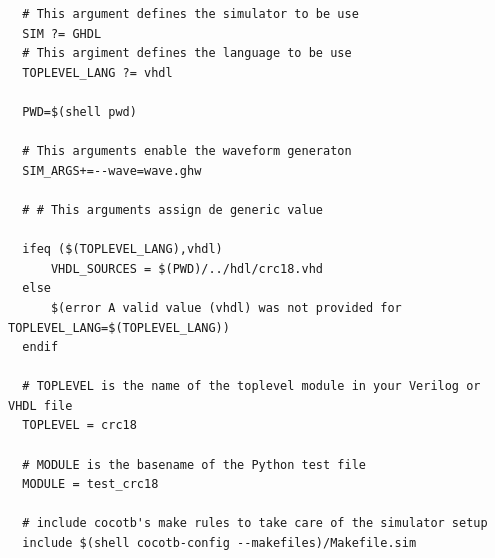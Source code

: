 {\scriptsize\begin{verbatim}
  # This argument defines the simulator to be use
  SIM ?= GHDL
  # This argiment defines the language to be use
  TOPLEVEL_LANG ?= vhdl
  
  PWD=$(shell pwd)
  
  # This arguments enable the waveform generaton
  SIM_ARGS+=--wave=wave.ghw
  
  # # This arguments assign de generic value
  
  ifeq ($(TOPLEVEL_LANG),vhdl)
      VHDL_SOURCES = $(PWD)/../hdl/crc18.vhd
  else
      $(error A valid value (vhdl) was not provided for TOPLEVEL_LANG=$(TOPLEVEL_LANG))
  endif
  
  # TOPLEVEL is the name of the toplevel module in your Verilog or VHDL file
  TOPLEVEL = crc18
  
  # MODULE is the basename of the Python test file
  MODULE = test_crc18
  
  # include cocotb's make rules to take care of the simulator setup
  include $(shell cocotb-config --makefiles)/Makefile.sim
\end{verbatim}}
